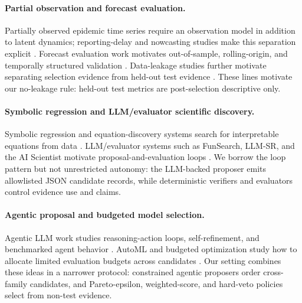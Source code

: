 \paragraph{Partial observation and forecast evaluation.}
Partially observed epidemic time series require an observation model in
addition to latent dynamics; reporting-delay and nowcasting studies make this
separation explicit \citep{king2016pomp,lawless1994reporting,mcgough2020nowcasting}.
Forecast evaluation work motivates out-of-sample, rolling-origin, and
temporally structured validation
\citep{tashman2000outofsample,hyndman2021fpp3,bergmeir2012cv,roberts2017cv}.
Data-leakage studies further motivate separating selection evidence from
held-out test evidence \citep{kaufman2012leakage,kapoor2023leakage}. These
lines motivate our no-leakage rule: held-out test metrics are post-selection
descriptive only.

\paragraph{Symbolic regression and LLM/evaluator scientific discovery.}
Symbolic regression and equation-discovery systems search for interpretable
equations from data
\citep{schmidt2009distilling,brunton2016sindy,udrescu2020aifeynman,
cranmer2023pysr,lacava2021symbolic}. LLM/evaluator systems such as FunSearch,
LLM-SR, and the AI Scientist motivate proposal-and-evaluation loops
\citep{romera2024funsearch,shojaee2024llmsr,lu2024aiscientist}. We borrow the
loop pattern but not unrestricted autonomy: the LLM-backed proposer emits
allowlisted JSON candidate records, while deterministic verifiers and
evaluators control evidence use and claims.

\paragraph{Agentic proposal and budgeted model selection.}
Agentic LLM work studies reasoning-action loops, self-refinement, and
benchmarked agent behavior \citep{yao2023react,madaan2023selfrefine,
liu2023agentbench}. AutoML and budgeted optimization study how to allocate
limited evaluation budgets across candidates
\citep{snoek2012bayesian,feurer2015automl,li2018hyperband,deb2002nsga2}. Our
setting combines these ideas in a narrower protocol: constrained agentic
proposers order cross-family candidates, and Pareto-epsilon, weighted-score,
and hard-veto policies select from non-test evidence.


